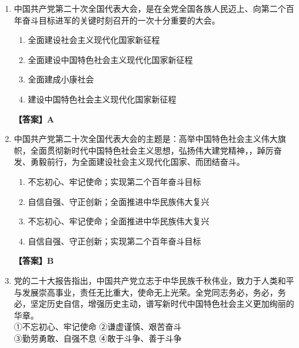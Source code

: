 \documentclass[UTF8,11pt,a4paper]{ctexart}
\begin{document}
\begin{enumerate}[label=\textbf{\arabic*.}, leftmargin=2.5em, itemsep=0.7em]
\begin{enumerate}[label=\Alph*., leftmargin=2em, itemsep=0.1em, topsep=0.15em]
\item 依规问责
\item 巡视整改
\item 民主集中制
\item 从严治党
\end{enumerate}
\textbf{【答案】C}
\item 中国共产党第二十次全国代表大会，是在全党全国各族人民迈上\allowbreak\underline{\hspace{4em}}、向第二个百年奋斗目标进军的关键时刻召开的一次十分重要的大会。
\begin{enumerate}[label=\Alph*., leftmargin=2em, itemsep=0.1em, topsep=0.15em]
\item 全面建设社会主义现代化国家新征程
\item 全面建设中国特色社会主义现代化国家新征程
\item 全面建成小康社会
\item 建设中国特色社会主义现代化国家新征程
\end{enumerate}
\textbf{【答案】A}
\item 中国共产党第二十次全国代表大会的主题是：高举中国特色社会主义伟大旗帜，全面贯彻新时代中国特色社会主义思想，弘扬伟大建党精神，\allowbreak\underline{\hspace{4em}}，踔厉奋发、勇毅前行，为全面建设社会主义现代化国家、\allowbreak\underline{\hspace{4em}}而团结奋斗。
\begin{enumerate}[label=\Alph*., leftmargin=2em, itemsep=0.1em, topsep=0.15em]
\item 不忘初心、牢记使命；实现第二个百年奋斗目标
\item 自信自强、守正创新；全面推进中华民族伟大复兴
\item 不忘初心、牢记使命；全面推进中华民族伟大复兴
\item 自信自强、守正创新；实现第二个百年奋斗目标
\end{enumerate}
\textbf{【答案】B}
\item 党的二十大报告指出，中国共产党立志于中华民族千秋伟业，致力于人类和平与发展崇高事业，责任无比重大，使命无上光荣。全党同志务必\allowbreak\underline{\hspace{4em}}，务必\allowbreak\underline{\hspace{4em}}，务必\allowbreak\underline{\hspace{4em}}，坚定历史自信，增强历史主动，谱写新时代中国特色社会主义更加绚丽的华章。\\ ①不忘初心、牢记使命 ②谦虚谨慎、艰苦奋斗\\ ③勤劳勇敢、自强不息 ④敢于斗争、善于斗争

\end{enumerate}
\end{document}
